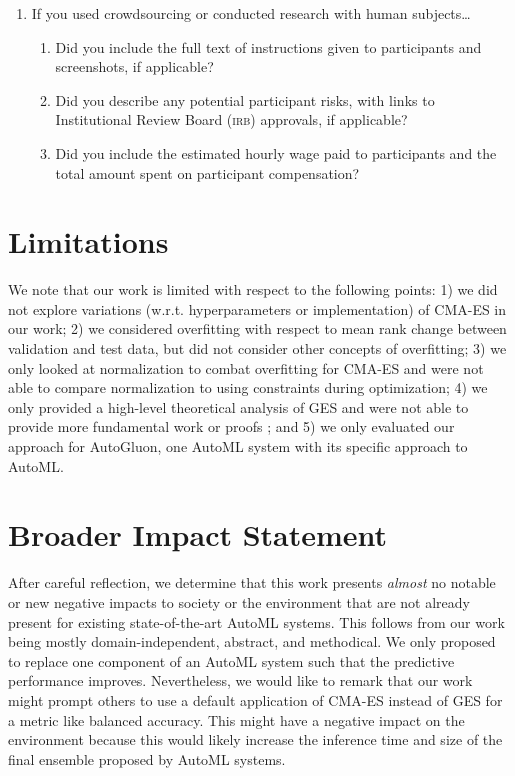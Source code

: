 \documentclass[11pt]{article}
\newcommand{\nbc}[3]{
		{\colorbox{#3}{\bfseries\sffamily\scriptsize\textcolor{white}{#1}}}
		{\textcolor{#3}{\sf\small$\blacktriangleright$\textit{#2}$\blacktriangleleft$}}
}
\newcommand{\changed}[1]{\nbc{CHANGED}{#1}{changedcolor}}
\renewcommand{\changed}[1]{{\color{changedcolor}#1}}
\renewcommand{\changed}[1]{{#1}}
\begin{document}
\begin{enumerate}
\item If you used crowdsourcing or conducted research with human subjects\dots
  \begin{enumerate}
  \item Did you include the full text of instructions given to participants and
    screenshots, if applicable?
  \item Did you describe any potential participant risks, with links to
    Institutional Review Board (\textsc{irb}) approvals, if applicable?
  \item Did you include the estimated hourly wage paid to participants and the
    total amount spent on participant compensation?
  \end{enumerate}
\end{enumerate}

\newpage
\section{Limitations}
\label{apdx/limitations}
We note that our work is limited with respect to the following points:
1) we did not explore variations (w.r.t.{} hyperparameters or implementation) of CMA-ES in our work;
2) we considered overfitting with respect to mean rank change between validation and test data, but did not consider other concepts of overfitting;
3) we only looked at normalization to combat overfitting for CMA-ES and were not able to compare normalization to using constraints during optimization;
4) we only provided a high-level theoretical analysis of GES and were not able to provide more fundamental work or proofs 
\changed{; and 5) we only evaluated our approach for AutoGluon, one AutoML system with its specific approach to AutoML.} 

\section{Broader Impact Statement}
\label{apdx/borader_impact}

After careful reflection, we determine that this work presents \emph{almost} no notable or new negative impacts to society or the environment that are not already present for existing state-of-the-art AutoML systems.
This follows from our work being mostly domain-independent, abstract, and methodical.
We only proposed to replace one component of an AutoML system such that the predictive performance improves. 
Nevertheless, we would like to remark that our work might prompt others to use a default application of CMA-ES instead of GES for a metric like balanced accuracy. 
This might have a negative impact on the environment because this would likely increase the inference time and size of the final ensemble proposed by AutoML systems. 
\end{document}
